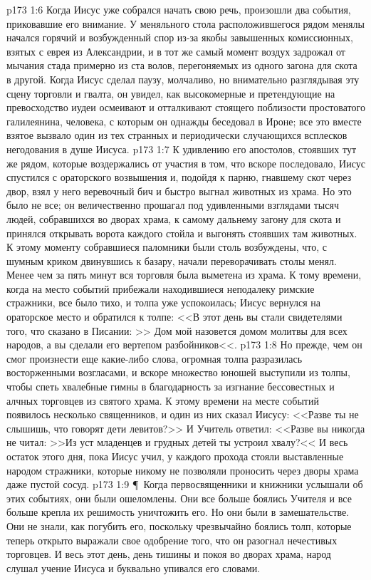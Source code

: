 \vs p173 1:6 Когда Иисус уже собрался начать свою речь, произошли два события, приковавшие его внимание. У меняльного стола расположившегося рядом менялы начался горячий и возбужденный спор из\hyp{}за якобы завышенных комиссионных, взятых с еврея из Александрии, и в тот же самый момент воздух задрожал от мычания стада примерно из ста волов, перегоняемых из одного загона для скота в другой. Когда Иисус сделал паузу, молчаливо, но внимательно разглядывая эту сцену торговли и гвалта, он увидел, как высокомерные и претендующие на превосходство иудеи осмеивают и отталкивают стоящего поблизости простоватого галилеянина, человека, с которым он однажды беседовал в Ироне; все это вместе взятое вызвало один из тех странных и периодически случающихся всплесков негодования в душе Иисуса.
\vs p173 1:7 К удивлению его апостолов, стоявших тут же рядом, которые воздержались от участия в том, что вскоре последовало, Иисус спустился с ораторского возвышения и, подойдя к парню, гнавшему скот через двор, взял у него веревочный бич и быстро выгнал животных из храма. Но это было не все; он величественно прошагал под удивленными взглядами тысяч людей, собравшихся во дворах храма, к самому дальнему загону для скота и принялся открывать ворота каждого стойла и выгонять стоявших там животных. К этому моменту собравшиеся паломники были столь возбуждены, что, с шумным криком двинувшись к базару, начали переворачивать столы менял. Менее чем за пять минут вся торговля была выметена из храма. К тому времени, когда на место событий прибежали находившиеся неподалеку римские стражники, все было тихо, и толпа уже успокоилась; Иисус вернулся на ораторское место и обратился к толпе: <<В этот день вы стали свидетелями того, что сказано в Писании: >> Дом мой назовется домом молитвы для всех народов, а вы сделали его вертепом разбойников<<.
\vs p173 1:8 Но прежде, чем он смог произнести еще какие\hyp{}либо слова, огромная толпа разразилась восторженными возгласами, и вскоре множество юношей выступили из толпы, чтобы спеть хвалебные гимны в благодарность за изгнание бессовестных и алчных торговцев из святого храма. К этому времени на месте событий появилось несколько священников, и один из них сказал Иисусу: <<Разве ты не слышишь, что говорят дети левитов?>> И Учитель ответил: <<Разве вы никогда не читал: >>Из уст младенцев и грудных детей ты устроил хвалу?<< И весь остаток этого дня, пока Иисус учил, у каждого прохода стояли выставленные народом стражники, которые никому не позволяли проносить через дворы храма даже пустой сосуд.
\vs p173 1:9 \P\ Когда первосвященники и книжники услышали об этих событиях, они были ошеломлены. Они все больше боялись Учителя и все больше крепла их решимость уничтожить его. Но они были в замешательстве. Они не знали, как погубить его, поскольку чрезвычайно боялись толп, которые теперь открыто выражали свое одобрение того, что он разогнал нечестивых торговцев. И весь этот день, день тишины и покоя во дворах храма, народ слушал учение Иисуса и буквально упивался его словами.
